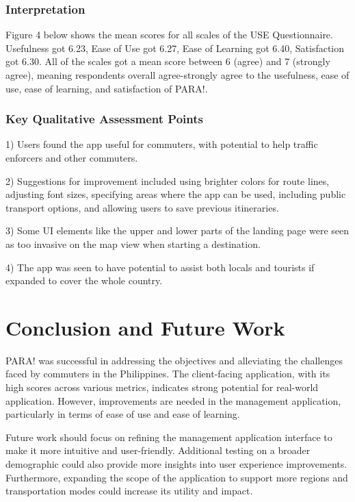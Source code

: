 \documentclass[journal]{./IEEE/IEEEtran}
\begin{document}
\subsubsection{Interpretation}
Figure 4 below shows the mean scores for all scales of the USE Questionnaire. Usefulness got 6.23, Ease of Use got 6.27, Ease of Learning got 6.40, Satisfaction got 6.30.
All of the scales got a mean score between 6 (agree) and 7 (strongly agree), meaning respondents overall agree-strongly agree to the usefulness, ease of use, ease of learning, and satisfaction of PARA!.
\subsubsection{Key Qualitative Assessment Points}
\begin{description}
    \item 1) Users found the app useful for commuters, with potential to help traffic enforcers and other commuters.
    \item 2) Suggestions for improvement included using brighter colors for route lines, adjusting font sizes, specifying areas where the app can be used, including public transport options, and allowing users to save previous itineraries.
    \item 3) Some UI elements like the upper and lower parts of the landing page were seen as too invasive on the map view when starting a destination.
    \item 4) The app was seen to have potential to assist both locals and tourists if expanded to cover the whole country.
\end{description}
\section{Conclusion and Future Work}
PARA! was successful in addressing the objectives and alleviating the challenges faced by commuters in the Philippines. The client-facing application, with its high scores across various metrics, indicates strong potential for real-world application. However, improvements are needed in the management application, particularly in terms of ease of use and ease of learning.

Future work should focus on refining the management application interface to make it more intuitive and user-friendly. Additional testing on a broader demographic could also provide more insights into user experience improvements. Furthermore, expanding the scope of the application to support more regions and transportation modes could increase its utility and impact.
\end{document}
